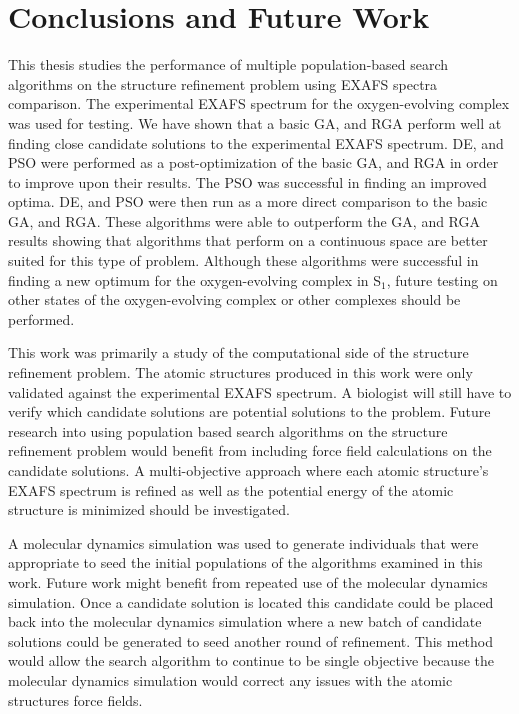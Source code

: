 \chapter{Conclusions and Future Work}

This thesis studies the performance of multiple population-based search algorithms on the structure refinement problem using EXAFS spectra comparison. The experimental EXAFS spectrum for the oxygen-evolving complex was used for testing. We have shown that a basic GA, and RGA perform well at finding close candidate solutions to the experimental EXAFS spectrum. DE, and PSO were performed as a post-optimization of the basic GA, and RGA in order to improve upon their results. The PSO was successful in finding an improved optima. DE, and PSO were then run as a more direct comparison to the basic GA, and RGA. These algorithms were able to outperform the GA, and RGA results showing that algorithms that perform on a continuous space are better suited for this type of problem. Although these algorithms were successful in finding a new optimum for the oxygen-evolving complex in S$_{1}$, future testing on other states of the oxygen-evolving complex or other complexes should be performed.

This work was primarily a study of the computational side of the structure refinement problem. The atomic structures produced in this work were only validated against the experimental EXAFS spectrum. A biologist will still have to verify which candidate solutions are potential solutions to the problem. Future research into using population based search algorithms on the structure refinement problem would benefit from including force field calculations on the candidate solutions. A multi-objective approach where each atomic structure's EXAFS spectrum is refined as well as the potential energy of the atomic structure is minimized should be investigated.

A molecular dynamics simulation was used to generate individuals that were appropriate to seed the initial populations of the algorithms examined in this work. Future work might benefit from repeated use of the molecular dynamics simulation. Once a candidate solution is located this candidate could be placed back into the molecular dynamics simulation where a new batch of candidate solutions could be generated to seed another round of refinement. This method would allow the search algorithm to continue to be single objective because the molecular dynamics simulation would correct any issues with the atomic structures force fields.